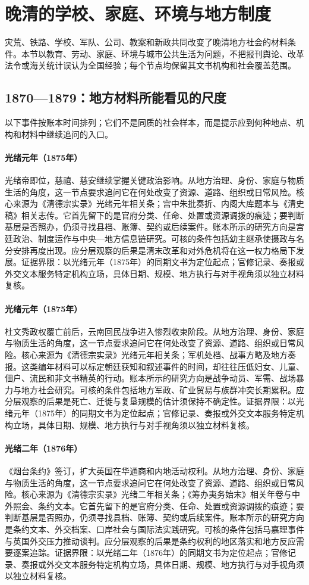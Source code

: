 \section{晚清的学校、家庭、环境与地方制度}
灾荒、铁路、学校、军队、公司、教案和新政共同改变了晚清地方社会的材料条件。本节以教育、劳动、家庭、环境与城市公共生活为问题，不把报刊舆论、改革法令或海关统计误认为全国经验；每个节点均保留其文书机构和社会覆盖范围。
\subsection{1870—1879：地方材料所能看见的尺度}
以下事件按账本时间排列；它们不是同质的社会样本，而是提示应到何种地点、机构和材料中继续追问的入口。
\hypertarget{social:EQ-1875-GUANGXU-ACCESSION}{}\paragraph{光绪元年（1875年）}光绪帝即位，慈禧、慈安继续掌握关键政治影响。从地方治理、身份、家庭与物质生活的角度，这一节点要求追问它在何处改变了资源、道路、组织或日常风险。核心来源为《清德宗实录》光绪元年相关条；宫中朱批奏折、内阁大库题本与《清史稿》相关志传。它首先留下的是官府分类、任命、处置或资源调拨的痕迹；要判断基层是否照办，仍须寻找县档、账簿、契约或后续案件。账本所示的研究方向是宫廷政治、制度运作与中央—地方信息链研究。可核的条件包括幼主继承使摄政与名分安排再度出现。应分层观察的后果是清末改革和对外危机将在这一权力格局下发展。证据界限：以光绪元年（1875年）的同期文书为定位起点；官修记录、奏报或外交文本服务特定机构立场，具体日期、规模、地方执行与对手视角须以独立材料复核。
\hypertarget{social:EQ-1875-YUNNAN-MUSLIM-WAR}{}\paragraph{光绪元年（1875年）}杜文秀政权覆亡前后，云南回民战争进入惨烈收束阶段。从地方治理、身份、家庭与物质生活的角度，这一节点要求追问它在何处改变了资源、道路、组织或日常风险。核心来源为《清德宗实录》光绪元年相关条；军机处档、战事方略及地方奏报。这类编年材料可以标定朝廷获知和叙述事件的时间，却往往压低妇女、儿童、佃户、流民和非文书精英的行动。账本所示的研究方向是战争动员、军需、战场暴力与地方社会研究。可核的条件包括地方军政、矿业贸易与族群冲突长期累积。应分层观察的后果是死亡、迁徙与复垦规模的估计须保持不确定性。证据界限：以光绪元年（1875年）的同期文书为定位起点；官修记录、奏报或外交文本服务特定机构立场，具体日期、规模、地方执行与对手视角须以独立材料复核。
\hypertarget{social:EQ-1876-CHEFOO-CONVENTION}{}\paragraph{光绪二年（1876年）}《烟台条约》签订，扩大英国在华通商和内地活动权利。从地方治理、身份、家庭与物质生活的角度，这一节点要求追问它在何处改变了资源、道路、组织或日常风险。核心来源为《清德宗实录》光绪二年相关条；《筹办夷务始末》相关年卷与中外照会、条约文本。它首先留下的是官府分类、任命、处置或资源调拨的痕迹；要判断基层是否照办，仍须寻找县档、账簿、契约或后续案件。账本所示的研究方向是条约文本、外交档案、口岸社会与国际法实践研究。可核的条件包括马嘉理事件与英国外交压力推动谈判。应分层观察的后果是条约权利的地区落实和地方反应需要逐案追踪。证据界限：以光绪二年（1876年）的同期文书为定位起点；官修记录、奏报或外交文本服务特定机构立场，具体日期、规模、地方执行与对手视角须以独立材料复核。
